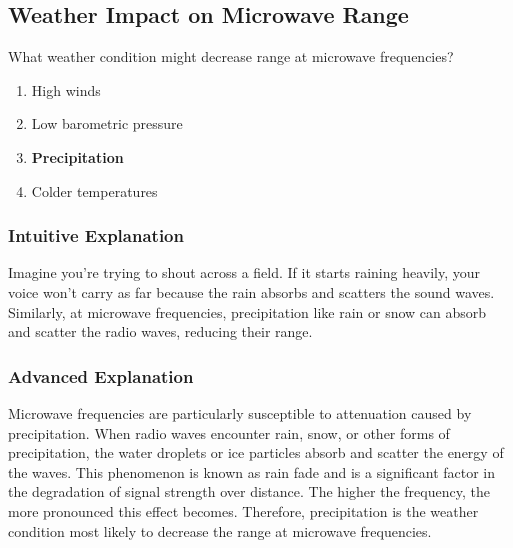 \subsection{Weather Impact on Microwave Range}
\label{T3A07}

\begin{tcolorbox}[colback=gray!10!white,colframe=black!75!black,title=T3A07]
What weather condition might decrease range at microwave frequencies?
\begin{enumerate}[noitemsep]
    \item High winds
    \item Low barometric pressure
    \item \textbf{Precipitation}
    \item Colder temperatures
\end{enumerate}
\end{tcolorbox}

\subsubsection*{Intuitive Explanation}
Imagine you're trying to shout across a field. If it starts raining heavily, your voice won't carry as far because the rain absorbs and scatters the sound waves. Similarly, at microwave frequencies, precipitation like rain or snow can absorb and scatter the radio waves, reducing their range.

\subsubsection*{Advanced Explanation}
Microwave frequencies are particularly susceptible to attenuation caused by precipitation. When radio waves encounter rain, snow, or other forms of precipitation, the water droplets or ice particles absorb and scatter the energy of the waves. This phenomenon is known as rain fade and is a significant factor in the degradation of signal strength over distance. The higher the frequency, the more pronounced this effect becomes. Therefore, precipitation is the weather condition most likely to decrease the range at microwave frequencies.